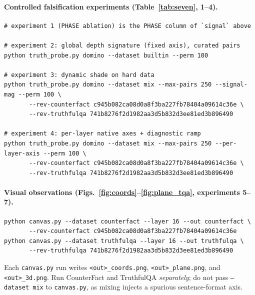 \documentclass[11pt]{article}
\begin{document}
\paragraph{Controlled falsification experiments (Table~\ref{tab:seven}, 1--4).}
\begin{verbatim}
# experiment 1 (PHASE ablation) is the PHASE column of `signal` above

# experiment 2: global depth signature (fixed axis), curated pairs
python truth_probe.py domino --dataset builtin --perm 100

# experiment 3: dynamic shade on hard data
python truth_probe.py domino --dataset mix --max-pairs 250 --signal-mag --perm 100 \
       --rev-counterfact c945b082ca08d0a8f3ba227fb78404a09614c36e \
       --rev-truthfulqa 741b8276f2d1982aa3d5b832d3ee81ed3b896490

# experiment 4: per-layer native axes + diagnostic ramp
python truth_probe.py domino --dataset mix --max-pairs 250 --per-layer-axis --perm 100 \
       --rev-counterfact c945b082ca08d0a8f3ba227fb78404a09614c36e \
       --rev-truthfulqa 741b8276f2d1982aa3d5b832d3ee81ed3b896490
\end{verbatim}

\paragraph{Visual observations (Figs.~\ref{fig:coords}--\ref{fig:plane_tqa}, experiments 5--7).}
\begin{verbatim}
python canvas.py --dataset counterfact --layer 16 --out counterfact \
       --rev-counterfact c945b082ca08d0a8f3ba227fb78404a09614c36e
python canvas.py --dataset truthfulqa --layer 16 --out truthfulqa \
       --rev-truthfulqa 741b8276f2d1982aa3d5b832d3ee81ed3b896490
\end{verbatim}
Each \texttt{canvas.py} run writes \texttt{<out>\_coords.png},
\texttt{<out>\_plane.png}, and \texttt{<out>\_3d.png}. Run CounterFact and
TruthfulQA \emph{separately}; do not pass \texttt{--dataset mix} to
\texttt{canvas.py}, as mixing injects a spurious sentence-format axis.
\end{document}
